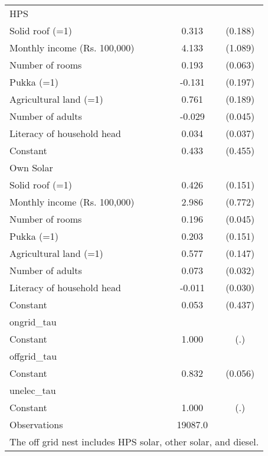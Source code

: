 \begin{table}[htbp]
{\begin{tabular}{l*{1}{cc}}
\midrule
HPS                   &                     &            \\
Solid roof (=1)     &       0.313\sym{*}  &     (0.188)\\
Monthly income (Rs. 100,000)&       4.133\sym{***}&     (1.089)\\
Number of rooms     &       0.193\sym{***}&     (0.063)\\
Pukka (=1)          &      -0.131         &     (0.197)\\
Agricultural land (=1)&       0.761\sym{***}&     (0.189)\\
Number of adults    &      -0.029         &     (0.045)\\
Literacy of household head&       0.034         &     (0.037)\\
Constant            &       0.433         &     (0.455)\\
\midrule
Own Solar                   &                     &            \\
Solid roof (=1)     &       0.426\sym{***}&     (0.151)\\
Monthly income (Rs. 100,000)&       2.986\sym{***}&     (0.772)\\
Number of rooms     &       0.196\sym{***}&     (0.045)\\
Pukka (=1)          &       0.203         &     (0.151)\\
Agricultural land (=1)&       0.577\sym{***}&     (0.147)\\
Number of adults    &       0.073\sym{**} &     (0.032)\\
Literacy of household head&      -0.011         &     (0.030)\\
Constant            &       0.053         &     (0.437)\\
\midrule
ongrid\_tau          &                     &            \\
Constant            &       1.000         &         (.)\\
\midrule
offgrid\_tau         &                     &            \\
Constant            &       0.832\sym{***}&     (0.056)\\
\midrule
unelec\_tau          &                     &            \\
Constant            &       1.000         &         (.)\\
\midrule
Observations        &     19087.0         &            \\
\bottomrule
\multicolumn{3}{l}{\footnotesize The off grid nest includes HPS solar, other solar, and diesel.}\\
\end{tabular}}
\end{table}
